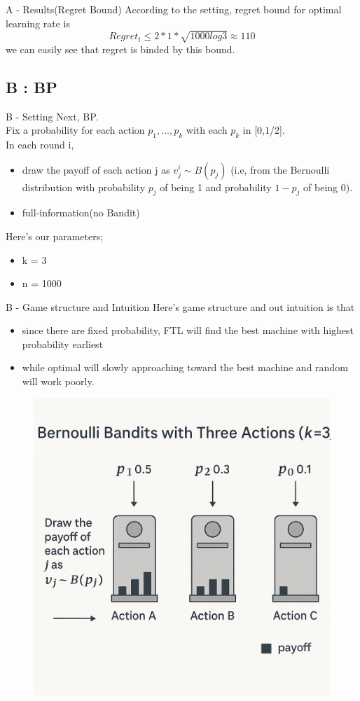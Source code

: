 \documentclass{beamer}
\begin{document}
\begin{frame}{A - Results(Regret Bound)}
    According to the setting, regret bound for optimal learning rate is
    \[
    Regret_t \leq 2 * 1 * \sqrt{1000log3} \approx 110
    \]
    we can easily see that regret is binded by this bound.
\end{frame}

\subsection{B : BP}

\begin{frame}{B - Setting}
    Next, BP.\\
    Fix a probability for each action $p_{1},...,p_{k}$ with each $p_{k}$ in [0,1/2].\\
    In each round i,
    \begin{itemize}
        \item draw the payoff of each action j as $v^{i}_{j} \sim B(p_{j})$ (i.e, from the Bernoulli distribution with probability $p_j$ of being 1 and probability $1-p_{j}$ of being 0).
        \item full-information(no Bandit)
    \end{itemize}
    \vspace{1em}
    Here's our parameters;
    \begin{itemize}
        \item k = 3
        \item n = 1000
    \end{itemize}
\end{frame}

\begin{frame}{B - Game structure and Intuition}
    Here's game structure and out intuition is that 
    \begin{itemize}
        \item since there are fixed probability, FTL will find the best machine with highest probability earliest
        \item while optimal will slowly approaching toward the best machine and random will work poorly.
    \end{itemize}
    \begin{figure}
        \centering
        \includegraphics[width=0.4\linewidth]{../figures/Image_B.png}
        \label{fig:placeholder}
    \end{figure}
\end{frame}
\end{document}
